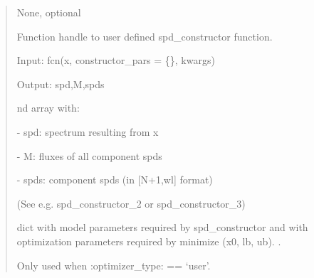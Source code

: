 \documentclass[letterpaper,10pt,english]{sphinxmanual}
\begin{document}
\begin{fulllineitems}
\begin{description}
\begin{quote}
\begin{description}
\item[{spd\_constructor}] \leavevmode
\begin{DUlineblock}{0em}
\item[] None, optional
\item[] Function handle to user defined spd\_constructor function.
\item[]
\begin{DUlineblock}{\DUlineblockindent}
\item[] Input: fcn(x, constructor\_pars = \{\}, kwargs)
\item[] Output: spd,M,spds
\item[]
\begin{DUlineblock}{\DUlineblockindent}
\item[] nd array with:
\item[]
\begin{DUlineblock}{\DUlineblockindent}
\item[]
\begin{DUlineblock}{\DUlineblockindent}
\item[] - spd: spectrum resulting from x
\end{DUlineblock}
\item[] - M: fluxes of all component spds
\item[]
\begin{DUlineblock}{\DUlineblockindent}
\item[] - spds: component spds (in {[}N+1,wl{]} format)
\end{DUlineblock}
\end{DUlineblock}
\end{DUlineblock}
\end{DUlineblock}
\item[] (See e.g. spd\_constructor\_2 or spd\_constructor\_3)
\end{DUlineblock}

\item[{spd\_model\_pars}] \leavevmode
\begin{DUlineblock}{0em}
\item[] dict with model parameters required by spd\_constructor
and with optimization parameters required by minimize (x0, lb, ub).                .
\item[] Only used when :optimizer\_type: == ‘user’.
\end{DUlineblock}


\end{description}
\end{quote}
\end{description}
\end{fulllineitems}
\end{document}
